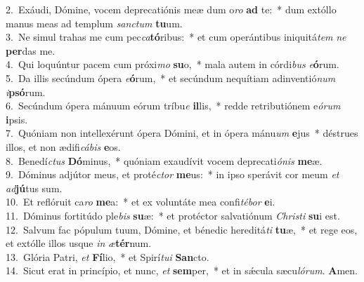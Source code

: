 {2.~}Exáudi, Dómine, vocem deprecatiónis meæ dum o\textit{ro} \textbf{ad} te:~* dum extóllo manus meas ad templum \textit{san}\textit{ctum} \textbf{tu}um.\\
{3.~}Ne simul trahas me cum pec\textit{ca}\textbf{tó}ribus:~* et cum operántibus iniquitá\textit{tem} \textit{ne} \textbf{per}das me.\\
{4.~}Qui loquúntur pacem cum próxi\textit{mo} \textbf{su}o,~* mala autem in córdi\textit{bus} \textit{e}\textbf{ó}rum.\\
{5.~}Da illis secúndum ópera \textit{e}\textbf{ó}rum,~* et secúndum nequítiam adinventió\textit{num} \textit{i}\textbf{psó}rum.\\
{6.~}Secúndum ópera mánuum eórum tríbu\textit{e} \textbf{il}lis,~* redde retributiónem e\textit{ó}\textit{rum} \textbf{i}psis.\\
{7.~}Quóniam non intellexérunt ópera Dómini, et in ópera mánu\textit{um} \textbf{e}jus~* déstrues illos, et non ædifi\textit{cá}\textit{bis} \textbf{e}os.\\
{8.~}Benedí\textit{ctus} \textbf{Dó}minus,~* quóniam exaudívit vocem deprecati\textit{ó}\textit{nis} \textbf{me}æ.\\
{9.~}Dóminus adjútor meus, et proté\textit{ctor} \textbf{me}us:~* in ipso sperávit cor meum \textit{et} \textit{ad}\textbf{jú}tus sum.\\
{10.~}Et reflóruit ca\textit{ro} \textbf{me}a:~* et ex voluntáte mea confi\textit{té}\textit{bor} \textbf{e}i.\\
{11.~}Dóminus fortitúdo ple\textit{bis} \textbf{su}æ:~* et protéctor salvatiónum \textit{Chri}\textit{sti} \textbf{su}i est.\\
{12.~}Salvum fac pópulum tuum, Dómine, et bénedic hereditá\textit{ti} \textbf{tu}æ,~* et rege eos, et extólle illos usque \textit{in} \textit{æ}\textbf{tér}num.\\
{13.~}Glória Patri, \textit{et} \textbf{Fí}lio,~* et Spirí\textit{tu}\textit{i} \textbf{San}cto.\\
{14.~}Sicut erat in princípio, et nunc, \textit{et} \textbf{sem}per,~* et in sǽcula sæcu\textit{ló}\textit{rum}. \textbf{A}men.\\
